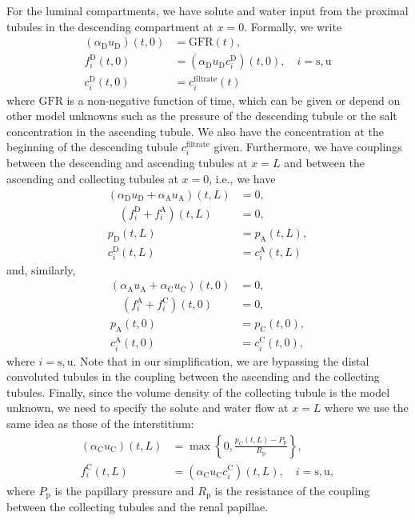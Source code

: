 \documentclass{article}
\begin{document}
For the luminal compartments, we have solute and water input from the proximal tubules in the descending compartment at $x=0$.
Formally, we write
\begin{align}
    (\alpha_\mathrm{D} u_\mathrm{D})(t,0) &= \mathrm{GFR}(t),\\
    f_i^\mathrm{D}(t,0) &= (\alpha_\mathrm{D}u_\mathrm{D}c_i^\mathrm{D})(t,0),\quad i=\mathrm{s,u}\\
    c_i^\mathrm{D}(t,0) &= c_{i}^{\mathrm{filtrate}}(t)
\end{align}
    where $\mathrm{GFR}$ is a non-negative function of time, which can be given or depend on other model unknowns such as the pressure of the descending tubule or the salt concentration in the ascending tubule.
We also have the concentration at the beginning of the descending tubule $c_i^\mathrm{filtrate}$ given.
Furthermore, we have couplings between the descending and ascending tubules at $x=L$ and between the ascending and collecting tubules at $x=0$, i.e., we have
\begin{align}
    (\alpha_\mathrm{D}u_\mathrm{D}+\alpha_\mathrm{A}u_\mathrm{A})(t,L) &= 0,\\
    \quad\left( f_i^\mathrm{D}+f_i^\mathrm{A} \right)(t,L) &= 0,\\
    p_\mathrm{D}(t,L)&= p_{\mathrm{A}}(t,L),\\ 
    c_i^\mathrm{D}(t,L) &=c_i^\mathrm{A}(t,L)
\end{align}
and, similarly,
\begin{align}
    (\alpha_\mathrm{A}u_\mathrm{A}+\alpha_\mathrm{C}u_\mathrm{C})(t,0) &= 0,\\
    \quad\left( f_i^\mathrm{A}+f_i^\mathrm{C} \right)(t,0) &= 0,\\
    p_\mathrm{A}(t,0)&= p_{\mathrm{C}}(t,0),\\ 
    c_i^\mathrm{A}(t,0) &=c_i^\mathrm{C}(t,0),
\end{align}
    where $i = \mathrm{s},\mathrm{u}$.
Note that in our simplification, we are bypassing the distal convoluted tubules in the coupling between the ascending and the collecting tubules.
Finally, since the volume density of the collecting tubule is the model unknown, we need to specify the solute and water flow at $x=L$ where we use the same idea as those of the interstitium:
\begin{align}
    (\alpha_\mathrm{C} u_\mathrm{C} )(t,L) &= \max\left\{ 0,\frac{p_\mathrm{C} (t,L) - P_{\mathrm{p}} }{R_{\mathrm{p}}}\right\},\\
    f_i^\mathrm{C}(t,L) &= (\alpha_\mathrm{C}  u_\mathrm{C}  c_i^\mathrm{C})(t,L),\quad i=\mathrm{s},\mathrm{u},
\end{align}
    where $P_\mathrm{p}$ is the papillary pressure and $R_\mathrm{p}$ is the resistance of the coupling between the collecting tubules and the renal papillae.
\end{document}
